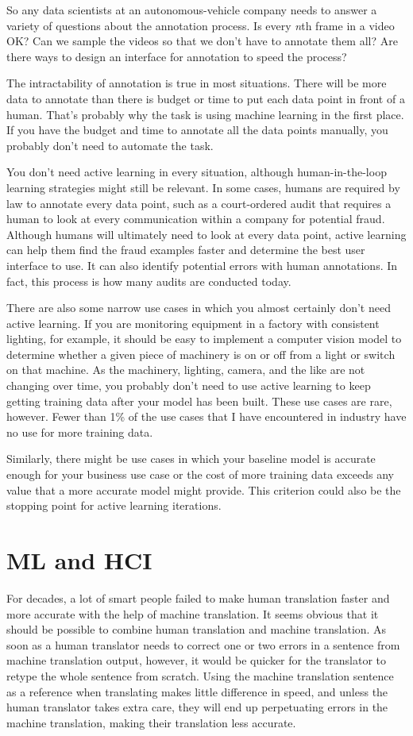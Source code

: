 \documentclass[sigconf,nonacm,screen,pbalance]{acmart}
\begin{document}
So
any data scientists at an autonomous-vehicle company needs to answer a variety of
questions about the annotation process. Is every {\em n}th frame in a video OK? Can we
sample the videos so that we don't have to annotate them all? Are there ways to design
an interface for annotation to speed the process?

The
intractability of annotation is true in most situations. There will be more data to
annotate than there is budget or time to put each data point in front of a human. That's
probably why the task is using machine learning in the first place. If you have the
budget and time to annotate all the data points manually, you probably don't need to
automate the task.

You
don't need active learning in every situation, although human-in-the-loop learning
strategies might still be relevant. In some cases, humans are required by law to
annotate every data point, such as a court-ordered audit that requires a human to look
at every communication within a company for potential fraud. Although humans will
ultimately need to look at every data point, active learning can help them find the
fraud examples faster and determine the best user interface to use. It can also identify
potential errors with human annotations. In fact, this process is how many audits are
conducted today.

There
are also some narrow use cases in which you almost certainly don't need active learning.
If you are monitoring equipment in a factory with consistent lighting, for example, it
should be easy to implement a computer vision model to determine whether a given piece
of machinery is on or off from a light or switch on that machine. As the machinery,
lighting, camera, and the like are not changing over time, you probably don't need to
use active learning to keep getting training data after your model has been built. These
use cases are rare, however. Fewer than 1\% of the use cases that I have encountered in
industry have no use for more training data.

Similarly,
there might be use cases in which your baseline model is accurate enough for your
business use case or the cost of more training data exceeds any value that a more
accurate model might provide. This criterion could also be the stopping point for active
learning
iterations.

\section{ML and HCI}
For
decades,
a lot of smart people failed to make human translation faster and more accurate with the
help of machine translation. It seems obvious that it should be possible to combine
human translation and machine translation. As soon as a human translator needs to
correct one or two errors in a sentence from machine translation output, however, it
would be quicker for the translator to retype the whole sentence from scratch. Using the
machine translation sentence as a reference when translating makes little difference in
speed, and unless the human translator takes extra care, they will end up perpetuating
errors in the machine translation, making their translation less accurate.
\end{document}
